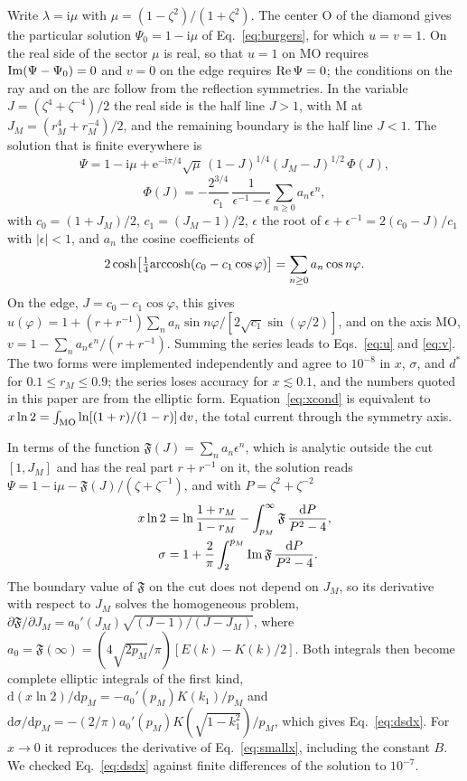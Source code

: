 \documentclass[reprint,aps,pre,superscriptaddress,longbibliography,floatfix,amsmath,amssymb]{revtex4-2}
\newcommand{\sig}{\sigma}                %
\newcommand{\dst}{d^{*}}                 %
\newcommand{\rM}{r_{M}}
\newcommand{\pM}{p_{M}}
\newcommand{\dd}{\mathrm{d}}
\newcommand{\ee}{\mathrm{e}}
\newcommand{\ii}{\mathrm{i}}
\begin{document}
Write $\lambda=\ii\mu$ with $\mu=(1-\zeta^2)/(1+\zeta^2)$. The center O of the diamond gives the particular solution $\Psi_0=1-\ii\mu$ of Eq.~\eqref{eq:burgers}, for which $u=v=1$. On the real side of the sector $\mu$ is real, so that $u=1$ on MO requires ${\rm Im}(\Psi-\Psi_0)=0$ and $v=0$ on the edge requires ${\rm Re}\,\Psi=0$; the conditions on the ray and on the arc follow from the reflection symmetries. In the variable $J=(\zeta^4+\zeta^{-4})/2$ the real side is the half line $J>1$, with M at $J_M=(\rM^4+\rM^{-4})/2$, and the remaining boundary is the half line $J<1$. The solution that is finite everywhere is
\begin{equation}
  \Psi=1-\ii\mu+\ee^{-\ii\pi/4}\sqrt{\mu}\,(1-J)^{1/4}(J_M-J)^{1/2}\,\Phi(J),
\end{equation}
\begin{equation}
  \Phi(J)=-\frac{2^{3/4}}{c_1}\,\frac{1}{\epsilon^{-1}-\epsilon}\sum_{n\ge0}a_n\epsilon^n ,
\end{equation}
with $c_0=(1+J_M)/2$, $c_1=(J_M-1)/2$, $\epsilon$ the root of $\epsilon+\epsilon^{-1}=2(c_0-J)/c_1$ with $|\epsilon|<1$, and $a_n$ the cosine coefficients of
\begin{equation}
  2\cosh\!\left[\tfrac14{\rm arccosh}(c_0-c_1\cos\varphi)\right]=\sum_{n\ge0}a_n\cos n\varphi .
\end{equation}
On the edge, $J=c_0-c_1\cos\varphi$, this gives $u(\varphi)=1+(r+r^{-1})\sum_na_n\sin n\varphi/[2\sqrt{c_1}\sin(\varphi/2)]$, and on the axis MO, $v=1-\sum_na_n\epsilon^n/(r+r^{-1})$. Summing the series leads to Eqs.~\eqref{eq:u} and \eqref{eq:v}. The two forms were implemented independently and agree to $10^{-8}$ in $x$, $\sig$, and $\dst$ for $0.1\le\rM\le0.9$; the series loses accuracy for $x\lesssim0.1$, and the numbers quoted in this paper are from the elliptic form. Equation~\eqref{eq:xcond} is equivalent to $x\ln2=\int_{\rm MO}\ln[(1+r)/(1-r)]\,\dd v$, the total current through the symmetry axis.

In terms of the function $\mathfrak F(J)=\sum_na_n\epsilon^n$, which is analytic outside the cut $[1,J_M]$ and has the real part $r+r^{-1}$ on it, the solution reads $\Psi=1-\ii\mu-\mathfrak F(J)/(\zeta+\zeta^{-1})$, and with $P=\zeta^2+\zeta^{-2}$
\begin{align}
  x\ln2&=\ln\frac{1+\rM}{1-\rM}-\int_{\pM}^{\infty}\mathfrak F\,\frac{\dd P}{P^2-4},\\
  \sig&=1+\frac2\pi\int_2^{\pM}{\rm Im}\,\mathfrak F\,\frac{\dd P}{P^2-4}.
\end{align}
The boundary value of $\mathfrak F$ on the cut does not depend on $J_M$, so its derivative with respect to $J_M$ solves the homogeneous problem, $\partial\mathfrak F/\partial J_M=a_0'(J_M)\sqrt{(J-1)/(J-J_M)}$, where $a_0=\mathfrak F(\infty)=(4\sqrt{2\pM}/\pi)[E(k)-K(k)/2]$. Both integrals then become complete elliptic integrals of the first kind, $\dd(x\ln2)/\dd\pM=-a_0'(\pM)K(k_1)/\pM$ and $\dd\sig/\dd\pM=-(2/\pi)a_0'(\pM)K(\sqrt{1-k_1^2})/\pM$, which gives Eq.~\eqref{eq:dsdx}. For $x\to0$ it reproduces the derivative of Eq.~\eqref{eq:smallx}, including the constant $B$. We checked Eq.~\eqref{eq:dsdx} against finite differences of the solution to $10^{-7}$.
\end{document}
